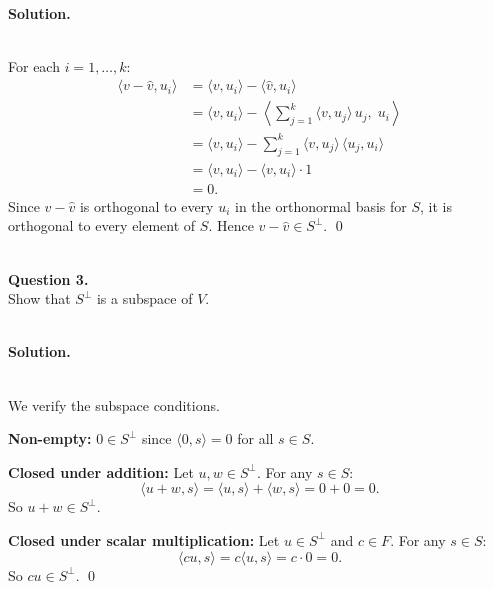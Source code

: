 \documentclass{article}
\newcommand{\ip}[2]{\langle #1, #2 \rangle}
\begin{document}
\noindent\\
\textbf{Solution.}\\
\quad\\
\begin{mdframed}[linewidth=1pt]
For each $i = 1, \dots, k$:
\begin{align*}
\ip{v - \hat{v}}{u_i}
&= \ip{v}{u_i} - \ip{\hat{v}}{u_i} \\
&= \ip{v}{u_i} - \left\langle \sum_{j=1}^{k} \ip{v}{u_j}\, u_j,\; u_i \right\rangle \\
&= \ip{v}{u_i} - \sum_{j=1}^{k} \ip{v}{u_j}\, \ip{u_j}{u_i} \\
&= \ip{v}{u_i} - \ip{v}{u_i} \cdot 1 \\
&= 0.
\end{align*}
Since $v - \hat{v}$ is orthogonal to every $u_i$ in the orthonormal basis for $S$, it is orthogonal to every element of $S$. Hence $v - \hat{v} \in S^\perp$. \qed
\end{mdframed}

\bigskip


\hfill \break  $~\!\!$ \dotfill \medskip \\
\textbf{Question 3.}\\
Show that $S^\perp$ is a subspace of $V$.

\noindent\\
\textbf{Solution.}\\
\quad\\
\begin{mdframed}[linewidth=1pt]
We verify the subspace conditions.

\textbf{Non-empty:} $0 \in S^\perp$ since $\ip{0}{s} = 0$ for all $s \in S$.

\textbf{Closed under addition:} Let $u, w \in S^\perp$. For any $s \in S$:
\[
\ip{u + w}{s} = \ip{u}{s} + \ip{w}{s} = 0 + 0 = 0.
\]
So $u + w \in S^\perp$.

\textbf{Closed under scalar multiplication:} Let $u \in S^\perp$ and $c \in F$. For any $s \in S$:
\[
\ip{cu}{s} = c\ip{u}{s} = c \cdot 0 = 0.
\]
So $cu \in S^\perp$. \qed
\end{mdframed}

\bigskip

\end{document}
